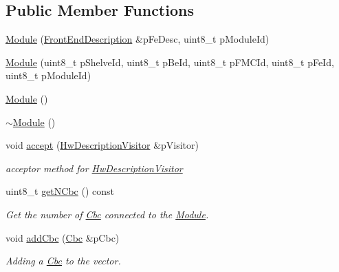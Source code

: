 \subsection*{Public Member Functions}
\begin{CompactItemize}
\item 
\hyperlink{class_ph2___hw_description_1_1_module_8e5a7e697a51121a0a701c61f319b5e9}{Module} (\hyperlink{class_ph2___hw_description_1_1_front_end_description}{Front\-End\-Description} \&p\-Fe\-Desc, uint8\_\-t p\-Module\-Id)
\item 
\hyperlink{class_ph2___hw_description_1_1_module_cb5e5f17c946438f985c209563060f26}{Module} (uint8\_\-t p\-Shelve\-Id, uint8\_\-t p\-Be\-Id, uint8\_\-t p\-FMCId, uint8\_\-t p\-Fe\-Id, uint8\_\-t p\-Module\-Id)
\item 
\hyperlink{class_ph2___hw_description_1_1_module_aec7dd439bdf7a1db3f2136569a00125}{Module} ()
\item 
\hyperlink{class_ph2___hw_description_1_1_module_8142f34ea2308ed78e8d0dbb042bc5f3}{$\sim$Module} ()
\item 
void \hyperlink{class_ph2___hw_description_1_1_module_67146504a8541df62c47233b859e4103}{accept} (\hyperlink{class_hw_description_visitor}{Hw\-Description\-Visitor} \&p\-Visitor)
\begin{CompactList}\small\item\em acceptor method for \hyperlink{class_hw_description_visitor}{Hw\-Description\-Visitor} \item\end{CompactList}\item 
uint8\_\-t \hyperlink{class_ph2___hw_description_1_1_module_e7fd58a25f6934dcb28ff5472ae69aff}{get\-NCbc} () const 
\begin{CompactList}\small\item\em Get the number of \hyperlink{class_ph2___hw_description_1_1_cbc}{Cbc} connected to the \hyperlink{class_ph2___hw_description_1_1_module}{Module}. \item\end{CompactList}\item 
void \hyperlink{class_ph2___hw_description_1_1_module_c2743d5056bc3053bf472e5fd94bbf14}{add\-Cbc} (\hyperlink{class_ph2___hw_description_1_1_cbc}{Cbc} \&p\-Cbc)
\begin{CompactList}\small\item\em Adding a \hyperlink{class_ph2___hw_description_1_1_cbc}{Cbc} to the vector. \item\end{CompactList}\item 

\end{CompactItemize}
